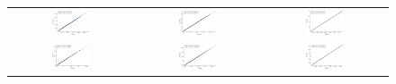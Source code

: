 \begin{figure}[hbtp]
\begin{tabular}{ccc}
%	
		\includegraphics[width=0.33\textwidth]{Figures/PotentialStudy/Upsilon_P_CorrelationTest} &
\includegraphics[width=0.33\textwidth]{Figures/PotentialStudy/Upsilon_E0_CorrelationTest} &
\includegraphics[width=0.33\textwidth]{Figures/PotentialStudy/Upsilon_theta_CorrelationTest} \\		%
		\includegraphics[width=0.33\textwidth]{Figures/PotentialStudy/Gamma_P_CorrelationTest} &
\includegraphics[width=0.33\textwidth]{Figures/PotentialStudy/Gamma_E0_CorrelationTest} &
\includegraphics[width=0.33\textwidth]{Figures/PotentialStudy/Gamma_theta_CorrelationTest} \\		


\end{tabular}
\end{figure}
